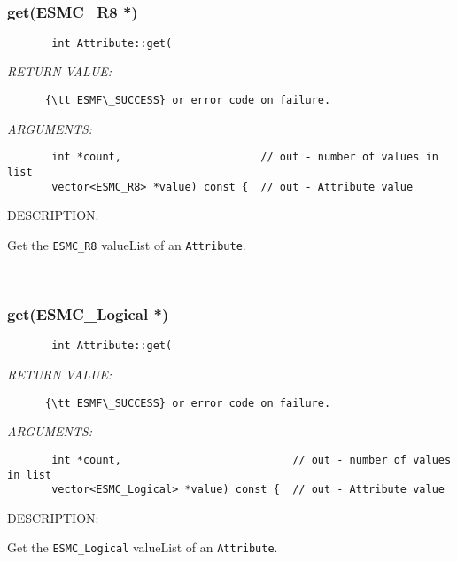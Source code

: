  
\mbox{}\hrulefill\
 
\subsubsection [get(ESMC\_R8] {get(ESMC\_R8 *)}


  
\begin{verbatim}       int Attribute::get(
   \end{verbatim}{\em RETURN VALUE:}
\begin{verbatim}      {\tt ESMF\_SUCCESS} or error code on failure.
   \end{verbatim}{\em ARGUMENTS:}
\begin{verbatim} 
       int *count,                      // out - number of values in list
       vector<ESMC_R8> *value) const {  // out - Attribute value
   \end{verbatim}
{\sf DESCRIPTION:\\ }


      Get the {\tt ESMC\_R8} valueList of an {\tt Attribute}.
   
 
\mbox{}\hrulefill\
 
\subsubsection [get(ESMC\_Logical] {get(ESMC\_Logical *)}


  
\begin{verbatim}       int Attribute::get(
   \end{verbatim}{\em RETURN VALUE:}
\begin{verbatim}      {\tt ESMF\_SUCCESS} or error code on failure.
   \end{verbatim}{\em ARGUMENTS:}
\begin{verbatim}       int *count,                           // out - number of values in list
       vector<ESMC_Logical> *value) const {  // out - Attribute value
   \end{verbatim}
{\sf DESCRIPTION:\\ }


      Get the {\tt ESMC\_Logical} valueList of an {\tt Attribute}.
   
